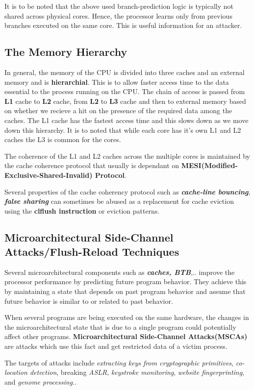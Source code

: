 \documentclass[12pt]{article}
\begin{document}
\begin{appendices}
	It is to be noted that the above used branch-prediction logic is typically not shared across physical cores. Hence, the processor learns only from previous branches executed on the same core. This is useful information for an attacker.
	\subsection{The Memory Hierarchy}
	In general, the memory of the CPU is divided into three caches and an external memory and is \textbf{hierarchial}. This is to allow faster access time to the data essential to the process running on the CPU. The chain of access is passed from \textbf{L1} cache to \textbf{L2} cache, from \textbf{L2} to \textbf{L3} cache and then to external memory based on whether we recieve a hit on the presence of the required data among the caches. The L1 cache has the fastest  access time and this slows down as we move down this hierarchy. It is to noted that while each core has it's own L1 and L2 caches the L3 is common for the cores.
	
	The coherence of the L1 and L2 caches across the multiple cores is maintained by the cache coherence protocol that usually is dependant on \textbf{MESI(Modified-Exclusive-Shared-Invalid) Protocol}.
	
	Several properties of the cache coherency protocol such as \textbf{\textit{cache-line bouncing}}, \textbf{\textit{false sharing}} can sometimes be abused as a replacement for cache eviction using the \textbf{clflush instruction} or eviction patterns.
	\subsection{Microarchitectural Side-Channel Attacks/Flush-Reload Techniques}
	Several microarchitectural components such as \textbf{\textit{caches, BTB}},.. improve the processor performance by predicting future program behavior. They achieve this by maintaining a state that depends on past program behavior and assume that future behavior is similar to or related to past behavior. 
	
	When several programs are being executed on the same hardware, the changes in the microarchitectural state that is due to a single program could potentially affect other programs. \textbf{Microarchitectural Side-Channel Attacks(MSCAs)} are attacks which use this fact and get restricted data of a victim process.
	
	The targets of attacks include \textit{extracting keys from cryptographic primitives}, \textit{co-location detection}, breaking \textit{ASLR}, \textit{keystroke monitoring}, \textit{website fingerprinting}, and \textit{genome processing}..
	

\end{appendices}
\end{document}
